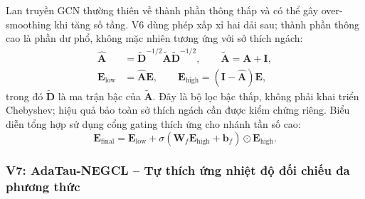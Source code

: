 Lan truyền GCN thường thiên về thành phần thông thấp và có thể gây over-smoothing khi tăng số tầng. V6 dùng phép xấp xỉ hai dải sau; thành phần thông cao là phần dư phổ, không mặc nhiên tương ứng với sở thích ngách:
\begin{align}
\hat{\mathbf{A}} &= \tilde{\mathbf{D}}^{-1/2}\tilde{\mathbf{A}}\tilde{\mathbf{D}}^{-1/2}, \qquad \tilde{\mathbf{A}}=\mathbf{A}+\mathbf{I}, \\
\mathbf{E}_{\text{low}} &= \hat{\mathbf{A}}\mathbf{E}, \qquad
\mathbf{E}_{\text{high}} = (\mathbf{I}-\hat{\mathbf{A}})\mathbf{E},
\end{align}
trong đó $\tilde{\mathbf{D}}$ là ma trận bậc của $\tilde{\mathbf{A}}$. Đây là bộ lọc bậc thấp, không phải khai triển Chebyshev; hiệu quả bảo toàn sở thích ngách cần được kiểm chứng riêng.
Biểu diễn tổng hợp sử dụng cổng gating thích ứng cho nhánh tần số cao:
\begin{equation}
\mathbf{E}_{\text{final}} = \mathbf{E}_{\text{low}} + \sigma(\mathbf{W}_f \mathbf{E}_{\text{high}} + \mathbf{b}_f) \odot \mathbf{E}_{\text{high}}.
\end{equation}

\subsubsection{V7: AdaTau-NEGCL -- Tự thích ứng nhiệt độ đối chiếu đa phương thức}

